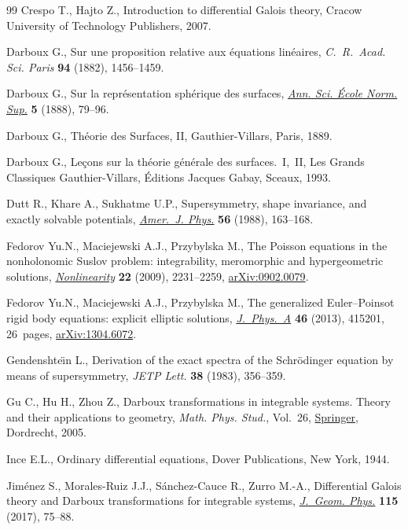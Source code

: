 \begin{thebibliography}{99}
Crespo T., Hajto Z., Introduction to differential {G}alois theory, Cracow
 University of Technology Publishers, 2007.

Darboux G., Sur une proposition relative aux \'equations lin\'eaires,
 \textit{C.~R.~Acad. Sci. Paris} \textbf{94} (1882), 1456--1459.

Darboux G., Sur la repr\'esentation sph\'erique des surfaces, \href{https://doi.org/10.24033/asens.307}{\textit{Ann. Sci.
 \'Ecole Norm. Sup.}} \textbf{5} (1888), 79--96.

Darboux G., Th\'eorie des Surfaces, II, Gauthier-Villars, Paris, 1889.

Darboux G., Le\c{c}ons sur la th\'eorie g\'en\'erale des surfaces.~{I},~{II},
 Les Grands Classiques Gauthier-Villars, \'Editions Jacques Gabay, Sceaux,
 1993.

Dutt R., Khare A., Sukhatme U.P., Supersymmetry, shape invariance, and exactly
 solvable potentials, \href{https://doi.org/10.1119/1.15697}{\textit{Amer.~J. Phys.}} \textbf{56} (1988), 163--168.

Fedorov Yu.N., Maciejewski A.J., Przybylska M., The {P}oisson equations in the
 nonholonomic {S}uslov problem: integrability, meromorphic and hypergeometric
 solutions, \href{https://doi.org/10.1088/0951-7715/22/9/009}{\textit{Nonlinearity}} \textbf{22} (2009), 2231--2259,
 \href{https://arxiv.org/abs/0902.0079}{arXiv:0902.0079}.

Fedorov Yu.N., Maciejewski A.J., Przybylska M., The generalized
 {E}uler--{P}oinsot rigid body equations: explicit elliptic solutions,
 \href{https://doi.org/10.1088/1751-8113/46/41/415201}{\textit{J.~Phys.~A}} \textbf{46} (2013), 415201, 26~pages, \href{https://arxiv.org/abs/1304.6072}{arXiv:1304.6072}.

Gendenshte\"{\i}n L., Derivation of the exact spectra of the {S}chr\"odinger
 equation by means of supersymmetry, \textit{JETP Lett.} \textbf{38} (1983),
 356--359.

Gu C., Hu H., Zhou Z., Darboux transformations in integrable systems. Theory
 and their applications to geometry, \textit{Math. Phys. Stud.}, Vol.~26,
 \href{https://doi.org/10.1007/1-4020-3088-6}{Springer}, Dordrecht, 2005.

Ince E.L., Ordinary differential equations, Dover Publications, New York, 1944.

Jim\'enez S., Morales-Ruiz J.J., S\'anchez-Cauce R., Zurro M.-A., Differential
 {G}alois theory and {D}arboux transformations for integrable systems,
 \href{https://doi.org/10.1016/j.geomphys.2016.06.016}{\textit{J.~Geom. Phys.}} \textbf{115} (2017), 75--88.


\end{thebibliography}
